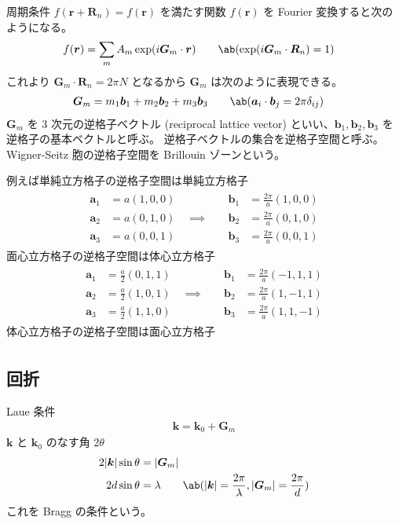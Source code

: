 \documentclass[uplatex,dvipdfmx,a4paper,11pt]{jlreq}
\newcommand{\rr}{\bm{r}}
\newcommand{\kk}{\bm{k}}
\renewcommand{\aa}{\bm{a}}
\newcommand{\bb}{\bm{b}}
\numberwithin{equation}{section}
\theoremstyle{definition}
\begin{document}
周期条件 $f(\rr + \bm{R}_n) = f(\rr)$ を満たす関数 $f(\rr)$ を Fourier 変換すると次のようになる。
\begin{align}
  f(\rr) & = \sum_{m}A_m\exp(i\bm{G}_m\cdot\rr) \qquad \ab(\exp(i\bm{G}_m\cdot\bm{R}_n) = 1)
\end{align}
これより $\bm{G}_m\cdot\bm{R}_n = 2\pi N$ となるから $\bm{G}_m$ は次のように表現できる。
\begin{align}
  \bm{G}_m & = m_1\bb_1 + m_2\bb_2 + m_3\bb_3 \qquad \ab(\aa_i\cdot\bb_j = 2\pi\delta_{ij})
\end{align}
$\bm{G}_m$ を 3 次元の逆格子ベクトル (reciprocal lattice vector) といい、$\bb_1, \bb_2, \bb_3$ を逆格子の基本ベクトルと呼ぶ。
逆格子ベクトルの集合を逆格子空間と呼ぶ。
Wigner-Seitz 胞の逆格子空間を Brillouin ゾーンという。

例えば単純立方格子の逆格子空間は単純立方格子
\begin{align}
  \begin{alignedat}{3}
    \aa_1 & = a(1, 0, 0) & \bb_1 & = \frac{2\pi}{a}(1, 0, 0) \\
    \aa_2 & = a(0, 1, 0) \quad\implies\quad & \bb_2 & = \frac{2\pi}{a}(0, 1, 0) \\
    \aa_3 & = a(0, 0, 1) & \bb_3 & = \frac{2\pi}{a}(0, 0, 1)
  \end{alignedat}
\end{align}
面心立方格子の逆格子空間は体心立方格子
\begin{align}
  \begin{alignedat}{3}
    \aa_1 & = \frac{a}{2}(0, 1, 1) & \bb_1 & = \frac{2\pi}{a}(-1, 1, 1) \\
    \aa_2 & = \frac{a}{2}(1, 0, 1) \quad\implies\quad & \bb_2 & = \frac{2\pi}{a}(1, -1, 1) \\
    \aa_3 & = \frac{a}{2}(1, 1, 0) & \bb_3 & = \frac{2\pi}{a}(1, 1, -1)
  \end{alignedat}
\end{align}
体心立方格子の逆格子空間は面心立方格子
\begin{align}
\end{align}

\subsection{回折}
Laue 条件
\begin{align}
  \kk = \kk_0 + \bm{G}_m
\end{align}
$\kk$ と $\kk_0$ のなす角 $2\theta$
\begin{align}
  2|\kk|\sin\theta & = |\bm{G}_m|                                                                    \\
  2d\sin\theta     & = \lambda \qquad \ab(|\kk| = \frac{2\pi}{\lambda}, |\bm{G}_m| = \frac{2\pi}{d})
\end{align}
これを Bragg の条件という。
\end{document}
